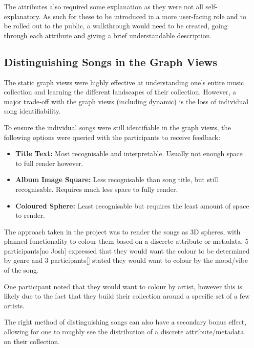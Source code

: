 The attributes also required some explanation as they were not all self-explanatory. As such for these to be introduced in a more user-facing role and to be rolled out to the public, a walkthrough would need to be created, going through each attribute and giving a brief understandable description.


\subsection{Distinguishing Songs in the Graph Views}
The static graph views were highly effective at understanding one's entire music collection and learning the different landscapes of their collection. However, a major trade-off with the graph views (including dynamic) is the loss of individual song identifiability. 

To ensure the individual songs were still identifiable in the graph views, the following options were queried with the participants to receive feedback:\begin{itemize}
    \item \textbf{Title Text:} Most recognisable and interpretable. Usually not enough space to full render however.
    \item \textbf{Album Image Square:} Less recognisable than song title, but still recognisable. Requires much less space to fully render.
    \item \textbf{Coloured Sphere:} Least recognisable but requires the least amount of space to render.
\end{itemize}

The approach taken in the project was to render the songs as 3D spheres, with planned functionality to colour them based on a discrete attribute or metadata. 5 participants[no Josh] expressed that they would want the colour to be determined by genre and 3 participants[] stated they would want to colour by the mood/vibe of the song.

One participant noted that they would want to colour by artist, however this is likely due to the fact that they build their collection around a specific set of a few artists.

The right method of distinguishing songs can also have a secondary bonus effect, allowing for one to roughly see the distribution of a discrete attribute/metadata on their collection.

